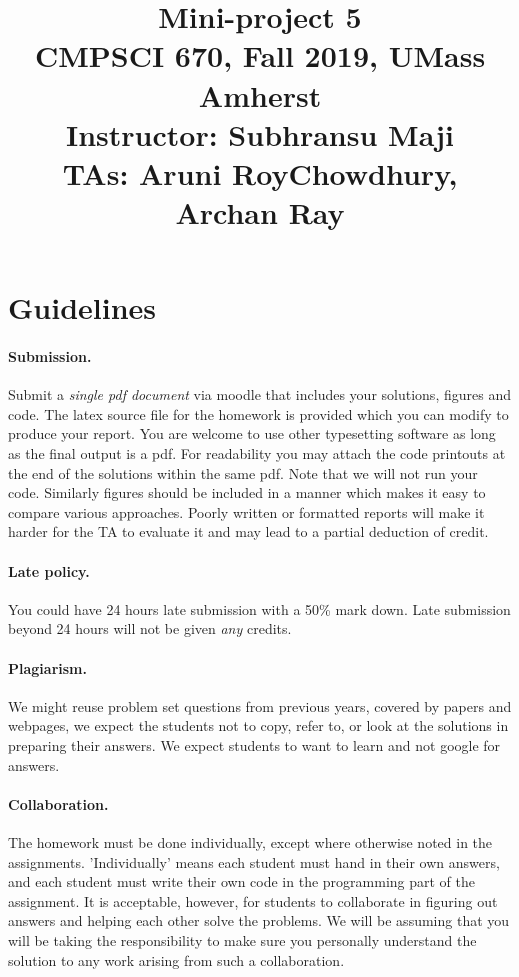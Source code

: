 \documentclass[10pt,letterpaper]{article}
\title{
  \textbf{Mini-project 5} \\
  \Large{CMPSCI 670, Fall 2019, UMass Amherst} \\
  \Large{Instructor: Subhransu Maji} \\
  \Large{TAs: Aruni RoyChowdhury, Archan Ray}
}
\date{}
\begin{document}
\maketitle

\renewcommand\thesubsection{\thesection.\alph{subsection}}


\section*{Guidelines}

\paragraph{Submission.} Submit a \emph{single pdf document} via moodle that includes your solutions, figures and code. The latex source file for the homework is provided which you can modify to produce your report. You are welcome to use other typesetting software as long as the final output is a pdf. For readability you may attach the code printouts at the end of the solutions within the same pdf. Note that we will not run your code. Similarly figures should be included in a manner which makes it easy to compare various approaches. Poorly written or formatted reports will make it harder for the TA to evaluate it and may lead to a partial deduction of credit. 

\paragraph{Late policy.} You could have 24 hours late submission with a 50\% mark down. Late submission beyond 24 hours will not be given \emph{any} credits.

\paragraph{Plagiarism.} We might reuse problem set questions from previous years, covered by papers and webpages, we expect the students not to copy, refer to, or look at the solutions in preparing their answers. We expect students to want to learn and not google for answers. 

\paragraph{Collaboration.} The homework must be done individually, except where otherwise noted in the assignments. 'Individually' means each student must hand in their own answers, and each student must write their own code in the programming part of the assignment. It is acceptable, however, for students to collaborate in figuring out answers and helping each other solve the problems. We will be assuming that you will be taking the responsibility to make sure you personally understand the solution to any work arising from such a collaboration.
\end{document}
